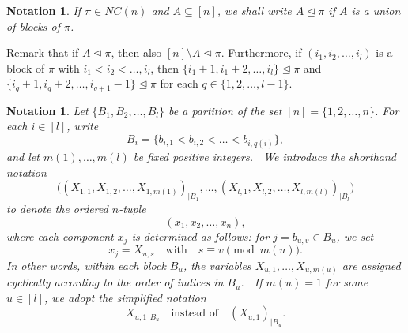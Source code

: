 \documentclass{amsart}
\newtheorem{notation}[claim]{Notation}
\begin{document}
\begin{notation}
	If $ \pi \in NC(n)$ and $ A \subseteq [n] $, we shall write
	 $ A \trianglelefteq \pi $ 
	 if $ A $ is a union of blocks of $ \pi $.
\end{notation}

 	Remark that if 
 	$ A \trianglelefteq \pi $, then also
 	$ [n]\setminus A \trianglelefteq \pi$.
 	Furthermore, if $(i_1, i_2, \dots, i_l)$ is a block of $\pi $ with $ i_1 < i_2 < \dots , i_l $, then $ \{ i_1+1, i_1 +2, \dots, i_l \} \trianglelefteq \pi $
 	and
 	$ \{ i_{q}+1, i_{q}+ 2, \dots, i_{q+1}- 1\} \trianglelefteq \pi $
 	for each 
 	$ q \in \{ 1, 2, \dots, l-1\}$.
 	
% 
% 
%  
% 
  \begin{notation}\label{notation:23}
 	Let $\{B_1, B_2, \dots, B_l\}$ be a partition of the set $[n] = \{1, 2, \dots, n\}$.
 	For each $i \in [l]$, write
 	\[
 	B_i = \{ b_{i,1} < b_{i,2} < \dots < b_{i,q(i)} \},
 	\]
 	and let $m(1), \dots, m(l)$ be fixed positive integers.
 	$\ $
 	We introduce the shorthand notation
 	\[
 	\big( (X_{1,1}, X_{1,2}, \dots, X_{1,m(1)})_{|B_1}, \dots, (X_{l,1}, X_{l,2}, \dots, X_{l,m(l)})_{|B_l} \big)
 	\]
 	to denote the ordered $n$-tuple
 	\[
 	(x_1, x_2, \dots, x_n),
 	\]
 	where each component $x_j$ is determined as follows:
 	for $j = b_{u,v} \in B_u$, we set
 	\[
 	x_j = X_{u,s} \quad \text{with} \quad s \equiv v \pmod{m(u)}.
 	\]
 	In other words, within each block $B_u$, the variables
 	$X_{u,1}, \dots, X_{u,m(u)}$
 	are assigned cyclically according to the order of indices in $B_u$.
 	$\ $
 	If $m(u) = 1$ for some $u \in [l]$, we adopt the simplified notation
 	\[
 	X_{u,1\,|B_u}
 	\quad \text{instead of} \quad
 	(X_{u,1})_{|B_u}.
 	\]
 \end{notation}
 
\end{document}
